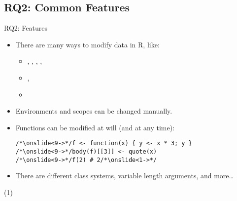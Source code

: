 \subsection{RQ2: Common Features}
\begin{frame}[fragile,b]{RQ2: Features}
   \vspace*{9mm}\begin{itemize}[<+(1)->]
      \itemsep\medskipamount
      \item<2-> There are many ways to modify data in R, like: \begin{itemize}
         \item<3-> , , , , 
         \item<4-> , 
         \item<5-> 
      \end{itemize}
      \item<6-> Environments and scopes can be changed manually.
      \item<8-> Functions can be modified at will (and at any time):
\begin{verbatim}
/*\onslide<9->*/f <- function(x) { y <- x * 3; y }
/*\onslide<9->*/body(f)[[3]] <- quote(x)
/*\onslide<9->*/f(2) # 2/*\onslide<1->*/
\end{verbatim}
      \item<10-> There are different class systems, variable length arguments, and more\ldots %
   \end{itemize}
%
(1)%
\end{frame}

